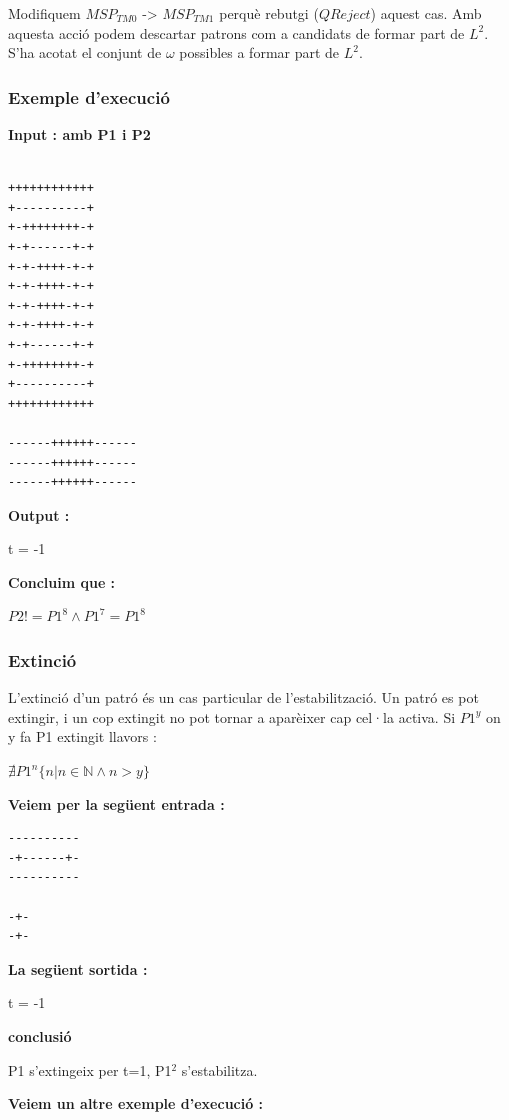 \documentclass[12pt,a4paper]{report}
\def \w{$\omega$}
\def \tmz{$MSP_{TM0} $}
\def \tmu{$MSP_{TM1} $}
\def \ld{$L^{2}$}
\begin{document}
Modifiquem \tmz{} -> \tmu{} perquè rebutgi ($QReject$) aquest cas. Amb aquesta acció podem descartar patrons com a candidats de formar part de \ld{}. S’ha acotat el conjunt de \w{} possibles a formar part de \ld{}.

\subsubsection{Exemple d'execució}

\textbf{Input : amb P1 i P2}

\begin{lstlisting}

++++++++++++
+----------+
+-++++++++-+
+-+------+-+
+-+-++++-+-+
+-+-++++-+-+
+-+-++++-+-+
+-+-++++-+-+
+-+------+-+
+-++++++++-+
+----------+
++++++++++++

------++++++------
------++++++------
------++++++------

\end{lstlisting}

\textbf{Output :}

t = -1

\textbf{Concluim que :}

$P2 != P1^8 \wedge P1^7 = P1^8$

\subsubsection{Extinció}

L’extinció d’un patró és un cas particular de l’estabilització. Un patró es pot extingir, i un cop extingit no pot tornar a aparèixer cap cel·la activa. Si $P1^y$ on y fa P1 extingit llavors :

\begin{center}
$\nexists P1^n \{n | n \in \mathbb{N} \wedge n > y\}$
\end{center}

\textbf{Veiem per la següent entrada :}

\begin{lstlisting}
----------
-+------+-
----------

-+-
-+-
\end{lstlisting}

\textbf{La següent sortida :}

t = -1


\textbf{conclusió}

P1 s'extingeix per t=1, P1$^2$ s'estabilitza.


\textbf{Veiem un altre exemple d’execució : }
\end{document}
